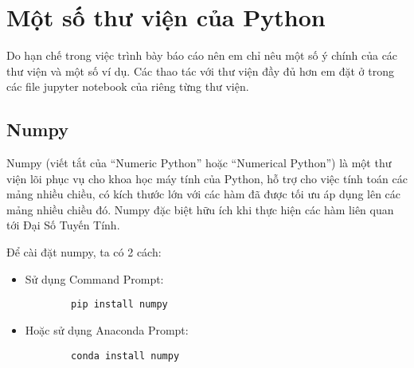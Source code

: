 \documentclass[../main-report.tex]{subfiles}
\begin{document}
\section{Một số thư viện của Python}
Do hạn chế trong việc trình bày báo cáo nên em chỉ nêu một số ý chính của các thư viện và một số ví dụ. Các thao tác với thư viện đầy đủ hơn em đặt ở trong các file jupyter notebook của riêng từng thư viện.
\subsection{Numpy}
Numpy (viết tắt của “Numeric Python” hoặc “Numerical Python”) là một thư
viện lõi phục vụ cho khoa học máy tính của Python, hỗ trợ cho việc tính toán các mảng
nhiều chiều, có kích thước lớn với các hàm đã được tối ưu áp dụng lên các mảng nhiều
chiều đó. Numpy đặc biệt hữu ích khi thực hiện các hàm liên quan tới Đại Số Tuyến Tính.

Để cài đặt numpy, ta có 2 cách:
\begin{itemize}
    \item Sử dụng Command Prompt: 
    \begin{lstlisting}
        pip install numpy
    \end{lstlisting}
    \item Hoặc sử dụng Anaconda Prompt:
    \begin{lstlisting}
        conda install numpy
    \end{lstlisting}
\end{itemize}
\end{document}
